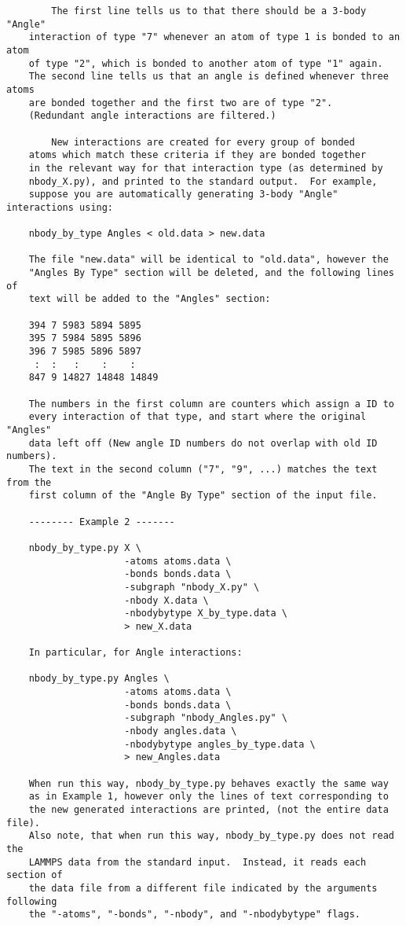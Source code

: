 \documentclass[11pt]{article}
\begin{document}
\begin{verbatim}
        The first line tells us to that there should be a 3-body "Angle" 
    interaction of type "7" whenever an atom of type 1 is bonded to an atom
    of type "2", which is bonded to another atom of type "1" again.
    The second line tells us that an angle is defined whenever three atoms 
    are bonded together and the first two are of type "2".
    (Redundant angle interactions are filtered.)

        New interactions are created for every group of bonded 
    atoms which match these criteria if they are bonded together 
    in the relevant way for that interaction type (as determined by
    nbody_X.py), and printed to the standard output.  For example, 
    suppose you are automatically generating 3-body "Angle" interactions using:

    nbody_by_type Angles < old.data > new.data

    The file "new.data" will be identical to "old.data", however the
    "Angles By Type" section will be deleted, and the following lines of
    text will be added to the "Angles" section:

    394 7 5983 5894 5895
    395 7 5984 5895 5896
    396 7 5985 5896 5897
     :  :   :    :    :
    847 9 14827 14848 14849

    The numbers in the first column are counters which assign a ID to 
    every interaction of that type, and start where the original "Angles"
    data left off (New angle ID numbers do not overlap with old ID numbers).
    The text in the second column ("7", "9", ...) matches the text from the 
    first column of the "Angle By Type" section of the input file.

    -------- Example 2 -------

    nbody_by_type.py X \
                     -atoms atoms.data \
                     -bonds bonds.data \
                     -subgraph "nbody_X.py" \
                     -nbody X.data \
                     -nbodybytype X_by_type.data \
                     > new_X.data

    In particular, for Angle interactions:

    nbody_by_type.py Angles \
                     -atoms atoms.data \
                     -bonds bonds.data \
                     -subgraph "nbody_Angles.py" \
                     -nbody angles.data \
                     -nbodybytype angles_by_type.data \
                     > new_Angles.data

    When run this way, nbody_by_type.py behaves exactly the same way
    as in Example 1, however only the lines of text corresponding to
    the new generated interactions are printed, (not the entire data file).
    Also note, that when run this way, nbody_by_type.py does not read the
    LAMMPS data from the standard input.  Instead, it reads each section of
    the data file from a different file indicated by the arguments following
    the "-atoms", "-bonds", "-nbody", and "-nbodybytype" flags.


\end{verbatim}
\end{document}
